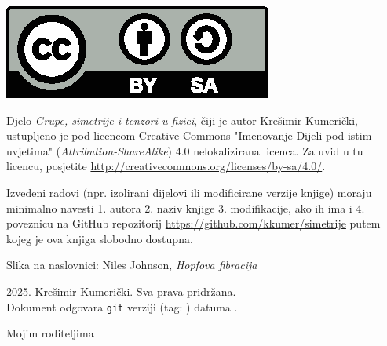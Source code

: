 
\thispagestyle{empty}

\vspace*{20em}


\centerline{\includegraphics[scale=1.0,clip]{pics/by-sa.eps}}
Djelo \emph{Grupe, simetrije i tenzori u fizici}, čiji je autor Krešimir
Kumerički, ustupljeno je pod licencom Creative Commons 
"Imenovanje-Dijeli pod istim uvjetima" (\emph{Attribution-ShareAlike}) 
4.0 nelokalizirana licenca. Za uvid u tu licencu, posjetite
\url{http://creativecommons.org/licenses/by-sa/4.0/}.

Izvedeni radovi (npr. izolirani dijelovi ili modificirane verzije knjige) moraju minimalno
navesti 1. autora 2. naziv knjige 3. modifikacije, ako ih ima i
4. poveznicu na GitHub repozitorij
\url{https://github.com/kkumer/simetrije} putem kojeg je ova knjiga
slobodno dostupna.

\vspace*{5em}
Slika na naslovnici: Niles Johnson, \emph{Hopfova fibracija}

\vspace*{5em}
\textcopyright{} 2025. Krešimir Kumerički. Sva prava pridržana.\\
Dokument odgovara \texttt{git} verziji \texttt{\githash} (tag: \texttt{\gittag}) datuma \gitdate.

\cleardoublepage
\thispagestyle{empty}
\vspace*{20em}
\begin{flushright}
Mojim roditeljima
\end{flushright}
\cleardoublepage
